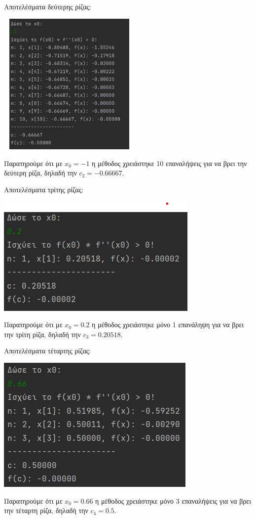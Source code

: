 \documentclass{article}
\begin{document}
    \vspace{3mm}
    Αποτελέσματα δεύτερης ρίζας: \\
    \begin{center}\includegraphics[width = 7cm, height = 7cm]{images/results_9.png}\end{center}
    Παρατηρούμε ότι με \(x_0 = -1\) η μέθοδος χρειάστηκε 10 επαναλήψεις για να βρει την δεύτερη ρίζα, δηλαδή την \(c_2 = -0.66667\).
    
    \vspace{3mm}
    Αποτελέσματα τρίτης ρίζας: \\
    \begin{center}\includegraphics[]{images/results_10.png}\end{center}
    Παρατηρούμε ότι με \(x_0 = 0.2\) η μέθοδος χρειάστηκε μόνο 1 επανάληψη για να βρει την τρίτη ρίζα, δηλαδή την \(c_3 = 0.20518\). 
    
    \vspace{3mm}
    Αποτελέσματα τέταρτης ρίζας: \\
    \begin{center}\includegraphics[]{images/results_11.png}\end{center}
    Παρατηρούμε ότι με \(x_0 = 0.66\) η μέθοδος χρειάστηκε μόνο 3 επαναλήψεις για να βρει την τέταρτη ρίζα, δηλαδή την \(c_4 = 0.5\). 
    
\end{document}
